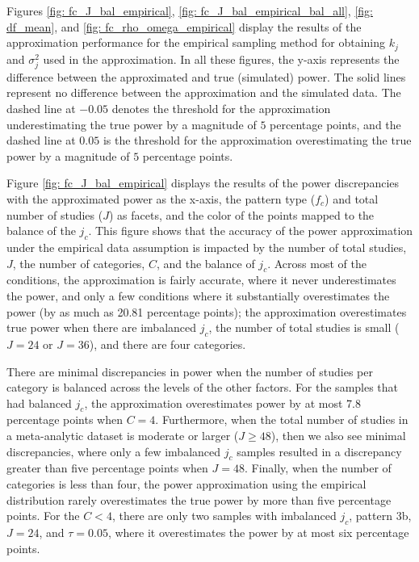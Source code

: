 Figures \ref{fig: fc_J_bal_empirical}, \ref{fig: fc_J_bal_empirical_bal_all}, \ref{fig: df_mean}, and \ref{fig: fc_rho_omega_empirical} display the results of the approximation performance for the empirical sampling method for obtaining $k_j$ and $\sigma_j^2$ used in the approximation. In all these figures, the y-axis represents the difference between the approximated and true (simulated) power. The solid lines represent no difference between the approximation and the simulated data. The dashed line at $-0.05$ denotes the threshold for the approximation underestimating the true power by a magnitude of $5$ percentage points, and the dashed line at $0.05$ is the threshold for the approximation overestimating the true power by a magnitude of $5$ percentage points. 

Figure \ref{fig: fc_J_bal_empirical} displays the results of the power discrepancies with the approximated power as the x-axis, the pattern type ($f_c$) and total number of studies ($J$) as facets, and the color of the points mapped to the balance of the $j_c$. This figure shows that the accuracy of the power approximation under the empirical data assumption is impacted by the number of total studies, $J$, the number of categories, $C$, and the balance of $j_c$. Across most of the conditions, the approximation is fairly accurate, where it never underestimates the power, and only a few conditions where it substantially overestimates the power (by as much as 20.81 percentage points); the approximation overestimates true power when there are imbalanced $j_c$, the number of total studies is small ($J = 24$ or $J = 36$), and there are four categories. 

There are minimal discrepancies in power when the number of studies per category is balanced across the levels of the other factors. For the samples that had balanced $j_c$, the approximation overestimates power by at most 7.8 percentage points when $ C=4$. Furthermore, when the total number of studies in a meta-analytic dataset is moderate or larger ($J \geq 48$), then we also see minimal discrepancies, where only a few imbalanced $j_c$ samples resulted in a discrepancy greater than five percentage points when $J = 48$. Finally, when the number of categories is less than four, the power approximation using the empirical distribution rarely overestimates the true power by more than five percentage points. For the $C < 4$, there are only two samples with imbalanced $j_c$, pattern 3b, $J=24$, and $\tau = 0.05$, where it overestimates the power by at most six percentage points.

